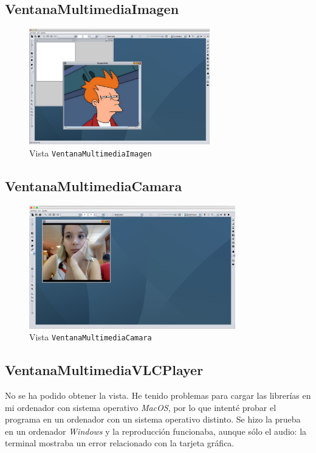 \subsection{VentanaMultimediaImagen}
\vskip0.3cm
\begin{figure}[H]
 \centering
  \includegraphics[width=0.7\textwidth]{graficos/ventanaImagen.jpg}
 \caption{Vista \texttt{VentanaMultimediaImagen}}
 \label{diseño}
 \end{figure}

\subsection{VentanaMultimediaCamara}
 
\vskip0.3cm
\begin{figure}[H]
 \centering
  \includegraphics[width=0.8\textwidth]{video/webcam.jpg}
 \caption{Vista \texttt{VentanaMultimediaCamara}}
 \label{diseño}
 \end{figure}

\subsection{VentanaMultimediaVLCPlayer} 
 No se ha podido obtener la vista. He tenido problemas para cargar las librerías en mi ordenador con sistema operativo \textit{MacOS}, por lo que intenté probar el programa en un ordenador con un sistema operativo distinto. Se hizo la prueba en un ordenador \textit{Windows} y la reproducción funcionaba, aunque sólo el audio: la terminal mostraba un error relacionado con la tarjeta gráfica.
\clearpage

